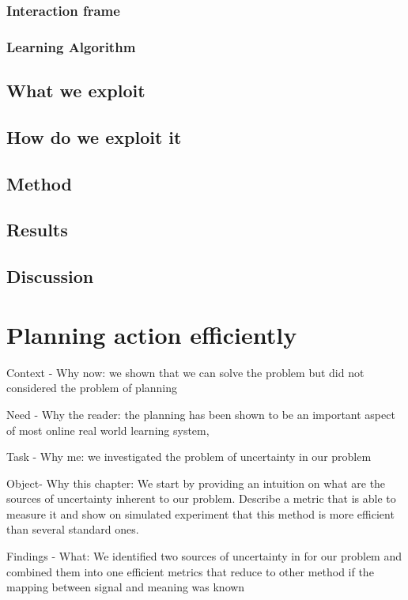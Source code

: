 \subsection{Interaction frame}

\subsection{Learning Algorithm}

\section{What we exploit}

\section{How do we exploit it}

\section{Method}

\section{Results}

\section{Discussion}

\chapter{Planning action efficiently}
\minitoc

Context - Why now: we shown that we can solve the problem but did not considered the problem of planning

Need - Why the reader: the planning has been shown to be an important aspect of most online real world learning system, 

Task - Why me: we investigated the problem of uncertainty in our problem

Object- Why this chapter: We start by providing an intuition on what are the sources of uncertainty inherent to our problem. Describe a metric that is able to measure it and show on simulated experiment that this method is more efficient than several standard ones.

Findings - What: We identified two sources of uncertainty in for our problem and combined them into one efficient metrics that reduce to other method if the mapping between signal and meaning was known

